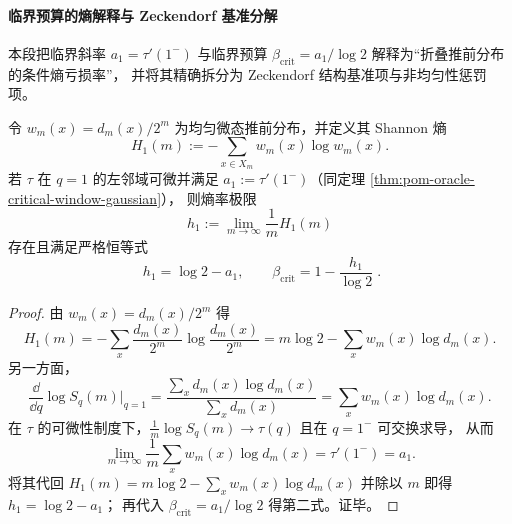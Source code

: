 \paragraph{临界预算的熵解释与 Zeckendorf 基准分解}
本段把临界斜率 \(a_1=\tau'(1^-)\) 与临界预算 \(\beta_{\mathrm{crit}}=a_1/\log 2\) 解释为“折叠推前分布的条件熵亏损率”，
并将其精确拆分为 Zeckendorf 结构基准项与非均匀性惩罚项。

\begin{theorem}[临界预算的熵恒等式]\label{thm:pom-oracle-critical-budget-entropy-identity}
令 \(w_m(x)=d_m(x)/2^m\) 为均匀微态推前分布，并定义其 Shannon 熵
\[
H_1(m):=-\sum_{x\in X_m}w_m(x)\log w_m(x).
\]
若 \(\tau\) 在 \(q=1\) 的左邻域可微并满足 \(a_1:=\tau'(1^-)\)（同定理 \ref{thm:pom-oracle-critical-window-gaussian}），
则熵率极限
\[
h_1:=\lim_{m\to\infty}\frac{1}{m}H_1(m)
\]
存在且满足严格恒等式
\[
\boxed{\;
h_1=\log 2-a_1,\qquad
\beta_{\mathrm{crit}}=1-\frac{h_1}{\log 2}\; } .
\]
\end{theorem}
\begin{proof}
由 \(w_m(x)=d_m(x)/2^m\) 得
\[
H_1(m)
=-\sum_x \frac{d_m(x)}{2^m}\log\frac{d_m(x)}{2^m}
=m\log 2-\sum_x w_m(x)\log d_m(x).
\]
另一方面，
\[
\frac{\dd}{\dd q}\log S_q(m)\Big|_{q=1}
=\frac{\sum_x d_m(x)\log d_m(x)}{\sum_x d_m(x)}
=\sum_x w_m(x)\log d_m(x).
\]
在 \(\tau\) 的可微性制度下，\(\frac{1}{m}\log S_q(m)\to\tau(q)\) 且在 \(q=1^-\) 可交换求导，
从而
\[
\lim_{m\to\infty}\frac{1}{m}\sum_x w_m(x)\log d_m(x)
=\tau'(1^-)=a_1.
\]
将其代回 \(H_1(m)=m\log 2-\sum_x w_m(x)\log d_m(x)\) 并除以 \(m\) 即得 \(h_1=\log 2-a_1\)；
再代入 \(\beta_{\mathrm{crit}}=a_1/\log 2\) 得第二式。证毕。
\end{proof}

